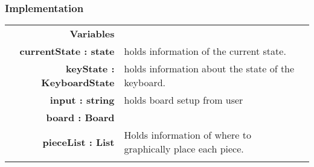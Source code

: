 \documentclass[10pt]{article}
\begin{document}
    \subsubsection{Implementation}
        \begin{longtabu}{ >{\bfseries}r Xp{2cm} }
            Variables       & \begin{tabular}[t]{@{} l p{8cm}} 
                                     & \\
                                    currentState : state & holds information of the current state. \\
			    keyState : KeyboardState & holds information about the state of the keyboard. \\
                                    input : string & holds board setup from user \\ 
                                    board : Board & \\
                                    pieceList : List &  Holds information of where to graphically place each piece. \\
                              \end{tabular} \\


\end{longtabu}
\end{document}
